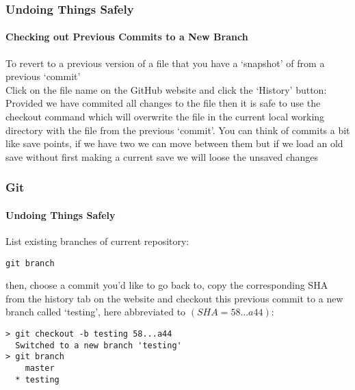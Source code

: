 \documentclass[xcolor=dvipsnames]{beamer}
\begin{document}
\begin{frame} 
\frametitle{Undoing Things Safely}
\framesubtitle{Checking out Previous Commits to a New Branch}
To revert to a previous version of a file that you have a `snapshot' of from a previous `commit'\\
Click on the file name on the GitHub website and click the `History' button:
\newline
\newline
Provided we have commited all changes to the file then it is safe to use the checkout command which will overwrite the file in the current local working directory with the file from the previous `commit'.
\newline
\newline
You can think of commits a bit like save points, if we have two we can move between them but if we load an old save without first making a current save we will loose the unsaved changes
\end{frame}

\begin{frame}[fragile]
\frametitle{Git}
\framesubtitle{Undoing Things Safely}
List existing branches of current repository:
\begin{block}{}
\begin{lstlisting}
git branch
\end{lstlisting}
\end{block}
then, choose a commit you'd like to go back to, copy the corresponding SHA from the history tab on the website and checkout this previous commit to a new branch called `testing', here abbreviated to $(SHA = 58...a44)$:
\begin{block}{}
\begin{lstlisting}
> git checkout -b testing 58...a44
  Switched to a new branch 'testing'
> git branch
    master
  * testing
\end{lstlisting}
\end{block}

\end{frame}
\end{document}
